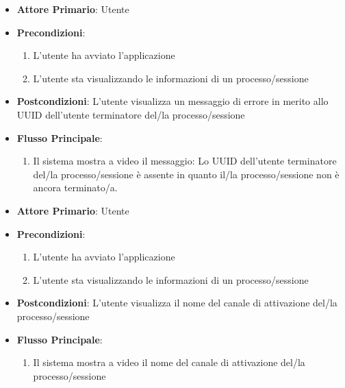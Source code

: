 \begin{itemize}
    \item \textbf{Attore Primario}: Utente
    \item \textbf{Precondizioni}:
    \begin{enumerate}
        \item L'utente ha avviato l'applicazione
        \item L'utente sta visualizzando le informazioni di un processo/sessione
    \end{enumerate}
    \item \textbf{Postcondizioni}: L'utente visualizza un messaggio di errore in merito allo UUID dell'utente terminatore del/la processo/sessione
    \item \textbf{Flusso Principale}:
        \begin{enumerate}
            \item Il sistema mostra a video il messaggio: Lo UUID dell'utente terminatore del/la processo/sessione è assente in quanto il/la processo/sessione non è ancora terminato/a.
        \end{enumerate}
\end{itemize}

\begin{itemize}
    \item \textbf{Attore Primario}: Utente
    \item \textbf{Precondizioni}:
    \begin{enumerate}
        \item L'utente ha avviato l'applicazione
        \item L'utente sta visualizzando le informazioni di un processo/sessione
    \end{enumerate}
    \item \textbf{Postcondizioni}: L'utente visualizza il nome del canale di attivazione del/la processo/sessione
    \item \textbf{Flusso Principale}:
        \begin{enumerate}
            \item Il sistema mostra a video il nome del canale di attivazione del/la processo/sessione
        \end{enumerate}
\end{itemize}

